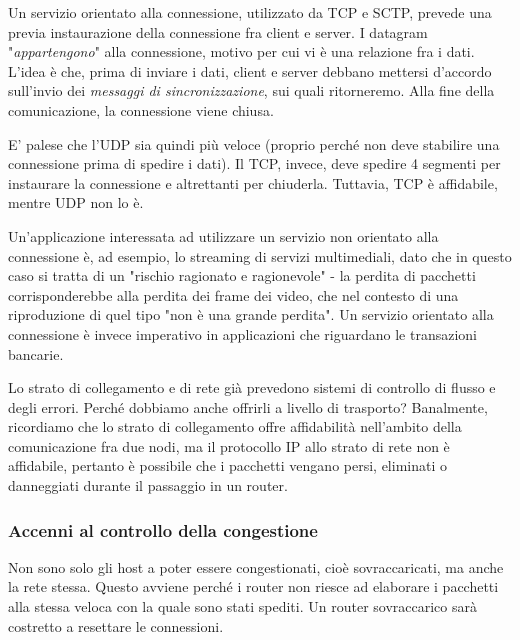             Un servizio orientato alla connessione, utilizzato da TCP e SCTP, prevede una previa instaurazione della connessione fra client e server. I datagram "\textit{appartengono}" alla connessione, motivo per cui vi è una relazione fra i dati. L'idea è che, prima di inviare i dati, client e server debbano mettersi d'accordo sull'invio dei \textit{messaggi di sincronizzazione}, sui quali ritorneremo. Alla fine della comunicazione, la connessione viene chiusa.
            
            \vspace{3mm}
            
            E' palese che l'UDP sia quindi più veloce (proprio perché non deve stabilire una connessione prima di spedire i dati). Il TCP, invece, deve spedire 4 segmenti per instaurare la connessione e altrettanti per chiuderla. Tuttavia, TCP è affidabile, mentre UDP non lo è.
            
            \vspace{3mm}
            
            Un'applicazione interessata ad utilizzare un servizio non orientato alla connessione è, ad esempio, lo streaming di servizi multimediali, dato che in questo caso si tratta di un "rischio ragionato e ragionevole" - la perdita di pacchetti corrisponderebbe alla perdita dei frame dei video, che nel contesto di una riproduzione di quel tipo "non è una grande perdita". 
            Un servizio orientato alla connessione è invece imperativo in applicazioni che riguardano le transazioni bancarie.
            
            \vspace{3mm}
            
            Lo strato di collegamento e di rete già prevedono sistemi di controllo di flusso e degli errori. Perché dobbiamo anche offrirli a livello di trasporto? Banalmente, ricordiamo che lo strato di collegamento offre affidabilità nell'ambito della comunicazione fra due nodi, ma il protocollo IP allo strato di rete non è affidabile, pertanto è possibile che i pacchetti vengano persi, eliminati o danneggiati durante il passaggio in un router.
            
        \subsubsection{Accenni al controllo della congestione}
        
            Non sono solo gli host a poter essere congestionati, cioè sovraccaricati, ma anche la rete stessa. Questo avviene perché i router non riesce ad elaborare i pacchetti alla stessa veloca con la quale sono stati spediti. Un router sovraccarico sarà costretto a resettare le connessioni.
            
